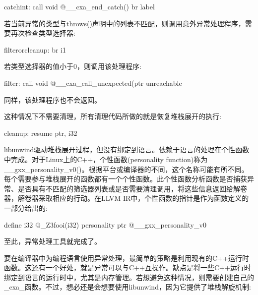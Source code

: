 \begin{shell}
catchint:
call void @__cxa_end_catch()
br label %
\end{shell}

若当前异常的类型与throws()声明中的列表不匹配，则调用意外异常处理程序，需要再次检查类型选择器:

\begin{shell}
filterorcleanup:
br i1 %
\end{shell}

若类型选择器的值小于0，则调用该处理程序:

\begin{shell}
filter:
call void @__cxa_call_unexpected(ptr %
unreachable
\end{shell}

同样，该处理程序也不会返回。

这种情况下不需要清理，所有清理代码所做的就是恢复堆栈展开的执行:

\begin{shell}
cleanup:
resume { ptr, i32 } %
\end{shell}

libunwind驱动堆栈展开过程，但没有绑定到语言。依赖于语言的处理在个性函数中完成。对于Linux上的C++，个性函数(personality function)称为\_\_gxx\_personality\_v0()。根据平台或编译器的不同，这个名称可能有所不同。每个需要参与堆栈展开的函数都有一个个性函数。此个性函数分析函数是否捕获异常、是否具有不匹配的筛选器列表或是否需要清理调用，将这些信息返回给解卷器，解卷器采取相应的行动。在LLVM IR中，个性函数的指针是作为函数定义的一部分给出的:

\begin{shell}
define i32 @_Z3fooi(i32) personality ptr @__gxx_personality_v0
\end{shell}

至此，异常处理工具就完成了。

要在编译器中为编程语言使用异常处理，最简单的策略是利用现有的C++运行时函数。这还有一个好处，就是异常可以与C++互操作。缺点是将一些C++运行时绑定到语言的运行时中，尤其是内存管理。若想避免这种情况，则需要创建自己的\_cxa\_函数。不过，想必还是会想要使用libunwind，因为它提供了堆栈解旋机制:

